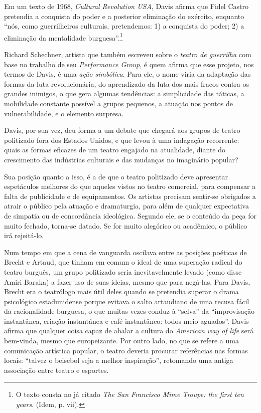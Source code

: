 Em um texto de 1968, \textit{Cultural Revolution USA}, Davis afirma que
Fidel Castro pretendia a conquista do poder e a posterior eliminação do
exército, enquanto “nós, como guerrilheiros culturais, pretendemos: 1) a
conquista do poder; 2) a eliminação da mentalidade burguesa”.\footnote{O
  texto consta no já citado \textit{The San Francisco Mime Troupe: the
  first ten years}. (Idem, p. vii).}

Richard Schechner, artista que também escreveu sobre o \textit{teatro de
guerrilha} com base no trabalho de seu \textit{Performance Group}, é quem
afirma que esse projeto, nos termos de Davis, é uma \textit{ação
simbólica}. Para ele, o nome viria da adaptação das formas da luta
revolucionária, do aprendizado da luta dos mais fracos contra os grandes
inimigos, o que gera algumas tendências: a simplicidade das táticas, a
mobilidade constante possível a grupos pequenos, a atuação nos pontos de
vulnerabilidade, e o elemento surpresa.

Davis, por sua vez, deu forma a um debate que chegará aos grupos de
teatro politizado fora dos Estados Unidos, e que levou à uma indagação
recorrente: quais as formas eficazes de um teatro engajado na
atualidade, diante do crescimento das indústrias culturais e das
mudanças no imaginário popular?

Sua posição quanto a isso, é a de que o teatro politizado deve
apresentar espetáculos melhores do que aqueles vistos no teatro
comercial, para compensar a falta de publicidade e de equipamentos. Os
artistas precisam sentir-se obrigados a atrair o público pela atuação e
dramaturgia, para além de qualquer expectativa de simpatia ou de
concordância ideológica. Segundo ele, se o conteúdo da peça for muito
fechado, torna-se datado. Se for muito alegórico ou acadêmico, o público
irá rejeitá-lo.

Num tempo em que a cena de vanguarda oscilava entre as posições poéticas
de Brecht e Artaud, que tinham em comum o ideal de uma superação radical
do teatro burguês, um grupo politizado seria inevitavelmente levado
(como disse Amiri Baraka) a fazer uso de suas ideias, mesmo que para
negá-las. Para Davis, Brecht era o teatrólogo mais útil deles quando se
pretendia superar o drama psicológico estadunidense porque evitava o
salto artaudiano de uma recusa fácil da racionalidade burguesa, o que
muitas vezes conduz à “selva” da “improvisação instantânea, criação
instantânea e café instantâneo: todos meio aguados”. Davis afirma que
qualquer coisa capaz de abalar a cultura do \textit{American way of life}
será bem-vinda, mesmo que europeizante. Por outro lado, no que se refere
a uma comunicação artística popular, o teatro deveria procurar
referências nas formas locais: “talvez o beisebol seja a melhor
inspiração”, retomando uma antiga associação entre teatro e esportes.

